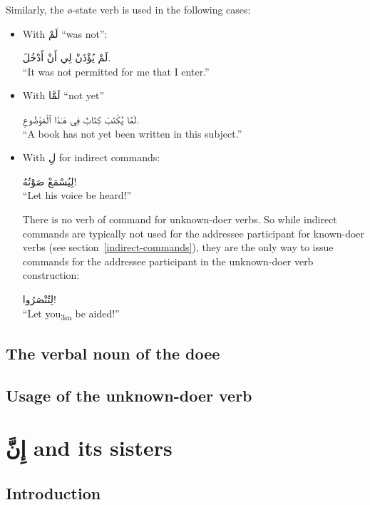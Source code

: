 \documentclass[
  10pt,
]{book}
\begin{document}
Similarly, the ø-state verb is used in the following cases:

\begin{itemize}
\item
  With \foreignlanguage{arabic}{لَمْ} \enquote{was not}:

  \foreignlanguage{arabic}{لَمْ يُؤْذَنْ لِي أَنْ أَدْخُلَ.}\\
  \enquote{It was not permitted for me that I enter.}
\item
  With \foreignlanguage{arabic}{لَمَّا} \enquote{not yet}

  \foreignlanguage{arabic}{لَمَّا يُکْتَبْ کِتَابٌ فِي هَـٰذَا ٱلْمَوْضُوعِ.}\\
  \enquote{A book has not yet been written in this subject.}
\item
  With \foreignlanguage{arabic}{لِ} for indirect commands:

  \foreignlanguage{arabic}{لِيُسْمَعْ صَوْتُهُ!}\\
  \enquote{Let his voice be heard!}

  There is no verb of command for unknown-doer verbs. So while indirect commands are typically not used for the addressee participant for known-doer verbs (see section~\ref{indirect-commands}), they are the only way to issue commands for the addressee participant in the unknown-doer verb construction:

  \foreignlanguage{arabic}{لِتُنْصَرُوا!}\\
  \enquote{Let you\textsubscript{3m} be aided!}
\end{itemize}

\section{The verbal noun of the doee}\label{the-verbal-noun-of-the-doee}

\section{Usage of the unknown-doer verb}\label{usage-of-the-unknown-doer-verb}

\chapter{\texorpdfstring{\foreignlanguage{arabic}{إِنَّ} and its sisters}{إِنَّ and its sisters}}\label{ux625ux646-and-its-sisters}

\section{Introduction}\label{introduction-21}
\end{document}
